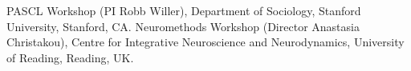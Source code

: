 	{PASCL Workshop (PI Robb Willer), Department of Sociology, Stanford University, Stanford, CA.}
	{Neuromethods Workshop (Director Anastasia Christakou), Centre for Integrative Neuroscience and Neurodynamics, University of Reading, Reading, UK.}

